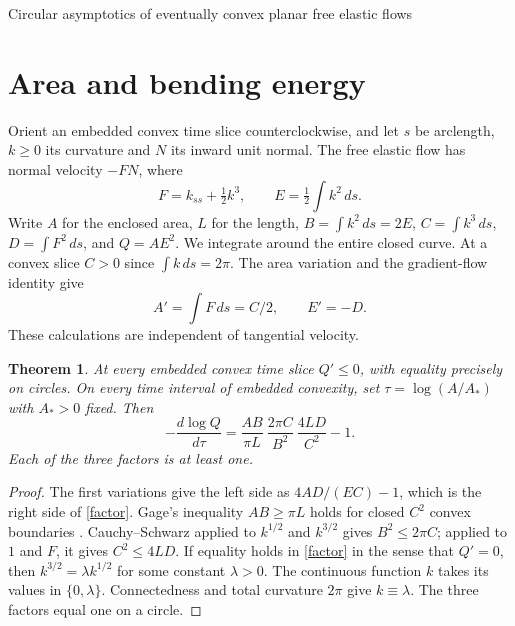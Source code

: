 \documentclass[10pt]{article}
\newtheorem{theorem}{Theorem}
\newcommand{\ds}{\,ds}
\begin{document}
\begin{center}
{\Large Circular asymptotics of eventually convex planar free elastic flows}
\end{center}
\begin{abstract}
For a smooth free elastic flow of closed plane curves, the product of
enclosed area and squared bending energy decreases strictly at each
embedded convex time slice unless that slice is round. This classifies
convex similarity solutions and gives smooth convergence, after length
normalization, for every flow which is embedded and convex for all
sufficiently large times. The proof combines Gage's inequality with an
exact dissipation identity and the circle stability theorem of Miura and
Wheeler.
\end{abstract}

\section{Area and bending energy}
Orient an embedded convex time slice counterclockwise, and let \(s\) be
arclength, \(k\geq 0\) its curvature and \(N\) its inward unit normal.
The free elastic flow has normal velocity \(-F N\), where
\[
 F=k_{ss}+\tfrac12 k^3,\qquad E=\tfrac12\int k^2\ds .
\]
Write \(A\) for the enclosed area, \(L\) for the length,
\(B=\int k^2\ds=2E\), \(C=\int k^3\ds\), \(D=\int F^2\ds\), and
\(Q=AE^2\). We integrate around the entire closed curve. At a convex
slice \(C>0\) since \(\int k\ds=2\pi\). The area variation and the
gradient-flow identity give
\[
 A'=\int F\ds=C/2,\qquad E'=-D.
\]
These calculations are independent of tangential velocity.

\begin{theorem}\label{mon}
At every embedded convex time slice \(Q'\leq0\), with equality precisely
on circles. On every time interval of embedded convexity, set
\(\tau=\log(A/A_*)\) with \(A_*>0\) fixed. Then
\begin{equation}\label{factor}
 -\frac{d\log Q}{d\tau}=
 \frac{AB}{\pi L}\ \frac{2\pi C}{B^2}\ \frac{4LD}{C^2}-1 .
\end{equation}
Each of the three factors is at least one.
\end{theorem}
\begin{proof}
The first variations give the left side as \(4AD/(EC)-1\), which is
the right side of \eqref{factor}. Gage's inequality \(AB\geq\pi L\)
holds for closed \(C^2\) convex boundaries \cite{gage}. Cauchy--Schwarz
applied to \(k^{1/2}\) and \(k^{3/2}\) gives \(B^2\leq2\pi C\);
applied to \(1\) and \(F\), it gives \(C^2\leq4LD\).
If equality holds in \eqref{factor} in the sense that \(Q'=0\), then
\(k^{3/2}=\lambda k^{1/2}\) for some constant \(\lambda>0\).
The continuous function \(k\) takes its values in \(\{0,\lambda\}\).
Connectedness and total curvature \(2\pi\) give \(k\equiv\lambda\).
The three factors equal one on a circle.
\end{proof}
\end{document}
